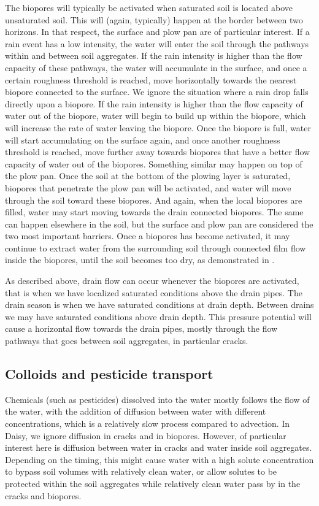 \documentclass[a4paper]{article}
\begin{document}
The biopores will typically be activated when saturated soil is
located above unsaturated soil.  This will (again, typically) happen
at the border between two horizons.  In that respect, the surface and
plow pan are of particular interest.  If a rain event has a low
intensity, the water will enter the soil through the pathways within
and between soil aggregates.  If the rain intensity is higher than the
flow capacity of these pathways, the water will accumulate in the
surface, and once a certain roughness threshold is reached, move
horizontally towards the nearest biopore connected to the surface.  We
ignore the situation where a rain drop falls directly upon a biopore.
If the rain intensity is higher than the flow capacity of water out of
the biopore, water will begin to build up within the biopore, which
will increase the rate of water leaving the biopore.  Once the biopore
is full, water will start accumulating on the surface again, and once
another roughness threshold is reached, move further away towards
biopores that have a better flow capacity of water out of the
biopores.  Something similar may happen on top of the plow pan.  Once
the soil at the bottom of the plowing layer is saturated, biopores
that penetrate the plow pan will be activated, and water will move
through the soil toward these biopores.  And again, when the local
biopores are filled, water may start moving towards the drain
connected biopores.  The same can happen elsewhere in the soil, but
the surface and plow pan are considered the two most important
barriers.  Once a biopores has become activated, it may continue to
extract water from the surrounding soil through connected film flow
inside the biopores, until the soil becomes too dry, as demonstrated
in \citet{tofteng2002film,gjettermann2004transport}.

As described above, drain flow can occur whenever the biopores are
activated, that is when we have localized saturated conditions above
the drain pipes.  The drain season is when we have saturated
conditions at drain depth.  Between drains we may have saturated
conditions above drain depth.  This pressure potential will cause a
horizontal flow towards the drain pipes, mostly through the flow
pathways that goes between soil aggregates, in particular cracks.

\subsection{Colloids and pesticide transport}

Chemicals (such as pesticides) dissolved into the water mostly follows
the flow of the water, with the addition of diffusion between water
with different concentrations, which is a relatively slow process
compared to advection.  In Daisy, we ignore diffusion in cracks and in
biopores.  However, of particular interest here is diffusion between
water in cracks and water inside soil aggregates.  Depending on the
timing, this might cause water with a high solute concentration to
bypass soil volumes with relatively clean water, or allow solutes to
be protected within the soil aggregates while relatively clean water
pass by in the cracks and biopores.
\end{document}
